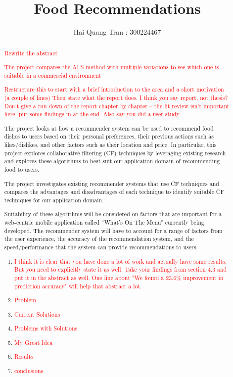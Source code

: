 \documentclass[11pt
, a4paper
, twoside
, openright
]{report}
\title{Food Recommendations}
\author{Hai Quang Tran : 300224467}
\date{}
\newcommand\todo[1]{\textcolor{red}{#1}}
\begin{document}
\frontmatter



\begin{abstract}

\todo{Rewrite the abstract}

\todo{The project compares the ALS method with multiple variations to see which one is suitable in a commercial environment}

\todo{Restructure this to start with a brief introduction to the area and a short motivation (a couple of lines)
	Then state what the report does. I think you say report, not thesis? 
	Don't give a run down of the report chapter by chapter -- the lit review isn't important here.
	put some findings in at the end.
	Also say you did a user study}


The project looks at how a recommender system can be used to recommend food dishes to users based on their personal preferences, their previous actions such as likes/dislikes, and other factors such as their location and price. In particular, this project explores collaborative filtering (CF) techniques by leveraging existing research and explores these algorithms to best suit our application domain of recommending food to users. 

The project investigates existing recommender systems that use CF techniques and compares the advantages and disadvantages of each technique to identify suitable CF techniques for our application domain. 

Suitability of these algorithms will be considered on factors that are important for a web-centric mobile application called ``What's On The Menu" currently being developed. The recommender system will have to account for a range of factors from the user experience, the accuracy of the recommendation system, and the speed/performance that the system can provide recommendations to users.

\begin{enumerate}
 \item \todo{I think it is clear that you have done a lot of work and actually have some results. But you need to explicitly state it as well. Take your findings from section 4.3 and put it in the abstract as well. One line about "We found a 23.6\% improvement in prediction accuracy" will help that abstract a lot. }
 \item \todo{Problem}
 \item \todo{Current Solutions}
 \item \todo{Problems with Solutions}
 \item \todo{My Great Idea}
 \item \todo{Results}
 \item \todo{conclusions}
\end{enumerate}


\end{abstract}
\end{document}
